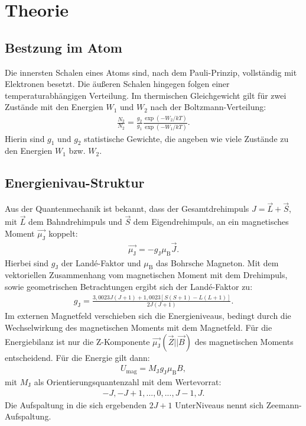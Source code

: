 \section{Theorie}
\label{sec:Theorie}
\subsection{Bestzung im Atom}
Die innersten Schalen eines Atoms sind, nach dem Pauli-Prinzip, vollständig mit Elektronen besetzt.
Die äußeren Schalen hingegen folgen einer temperaturabhängigen Verteilung.
Im thermischen Gleichgewicht gilt für zwei Zustände mit den Energien $W_\mathrm{1}$ und $W_\mathrm{2}$ nach der Boltzmann-Verteilung:
\begin{align}
  \frac{N_2}{N_2}=\frac{g_\mathrm{2}}{g_\mathrm{1}}\frac{\exp(-W_\mathrm{2}/kT)}{\exp(-W_\mathrm{1}/kT)}.
\end{align}
Hierin sind $g_1$ und $g_2$ statistische Gewichte, die angeben wie viele Zustände zu den Energien $W_\mathrm{1}$ bzw. $W_\mathrm{2}$.

\subsection{Energienivau-Struktur}
Aus der Quantenmechanik ist bekannt, dass der Gesamtdrehimpuls $J=\vec{L}+\vec{S}$,
mit $\vec{L}$ dem Bahndrehimpuls und $\vec{S}$ dem Eigendrehimpuls, an ein magnetisches Moment $\vec{\mu_\mathrm{J}}$
koppelt:
\begin{align}
  \vec{\mu_\mathrm{J}}=-g_\mathrm{J}\mu_\mathrm{B}\vec{J}.
\end{align}
Hierbei sind $g_\mathrm{J}$ der Landé-Faktor und $\mu_\mathrm{B}$ das Bohrsche Magneton.
Mit dem vektoriellen Zusammenhang vom magnetischen Moment mit dem Drehimpuls, sowie
geometrischen Betrachtungen ergibt sich der Landé-Faktor zu:
\begin{align}
  g_\mathrm{J}=\frac{3,0023J(J+1)+1,0023[S(S+1)-L(L+1)]}{2J(J+1)}.
\end{align}
Im externen Magnetfeld verschieben sich die Energieniveaus, bedingt durch  die Wechselwirkung des magnetischen
Moments mit dem Magnetfeld. Für die Energiebilanz ist nur die Z-Komponente $\vec{\mu_\mathrm{J}}(\vec{Z}||\vec{B})$ des magnetischen Moments
entscheidend.
Für die Energie gilt dann:
\begin{align}
  U_\mathrm{mag}=M_\mathrm{J}g_\mathrm{J}\mu_\mathrm{B}B,
\end{align}
mit $M_\mathrm{J}$ als Orientierungsquantenzahl mit dem Wertevorrat:
\begin{align}
  -J,-J+1,...,0,...,J-1,J.
\end{align}
Die Aufspaltung in die sich ergebenden $2J+1$ UnterNiveaus nennt sich Zeemann-Aufspaltung.

